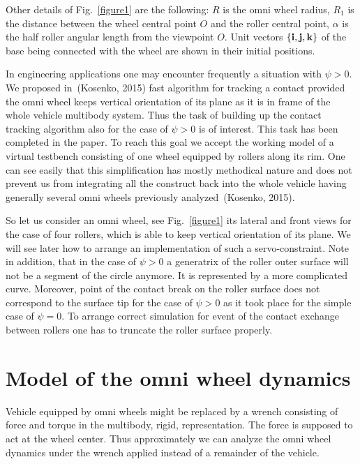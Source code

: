 \documentclass{jsme-tj}
\begin{document}
Other details of Fig.~\ref{figure1} are the following: $R$ is the omni 
wheel radius, $R_1$ is the distance between the wheel central point $O$ and the 
roller central point, $\alpha $ is the half roller angular length from the 
viewpoint $O$. Unit vectors $\{ {\bf i},{\bf j},{\bf k}\} $ of the base being
connected with the wheel are shown in their initial positions.

In engineering applications one may encounter frequently a situation with 
$\psi >0$. We proposed in~(Kosenko, 2015) fast algorithm for tracking a contact 
provided the omni wheel keeps vertical orientation of its plane as it is in 
frame of the whole vehicle multibody system. Thus the task of building up the 
contact tracking algorithm also for the case of $\psi >0$ is of interest. This 
task has been completed in the paper. To reach this goal we accept the working 
model of a virtual testbench consisting of one wheel equipped by rollers along 
its rim. One can see easily that this simplification has mostly methodical 
nature and does not prevent us from integrating all the construct back into the 
whole vehicle having generally several omni wheels previously 
analyzed~(Kosenko, 2015).

So let us consider an omni wheel, see Fig.~\ref{figure1} its lateral and front 
views for the case of four rollers, which is able to keep vertical orientation 
of its plane. We will see later how to arrange an implementation of such a 
servo-constraint. Note in addition, that in the case of $\psi >0$ a generatrix 
of the roller outer surface will not be a segment of the circle anymore. It is 
represented by a more complicated curve. Moreover, point of the contact break 
on the roller surface does not correspond to the surface tip for the case of 
$\psi >0$ as it took place for the simple case of $\psi =0$. To arrange correct 
simulation for event of the contact exchange between rollers one has to 
truncate the roller surface properly.

\section{Model of the omni wheel dynamics}

Vehicle equipped by omni wheels might be replaced by a wrench consisting of 
force and torque in the multibody, rigid, representation. The force is supposed 
to act at the wheel center. Thus approximately we can analyze the omni wheel 
dynamics under the wrench applied instead of a remainder of the vehicle.
\end{document}
